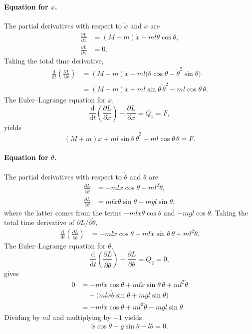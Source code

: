 \documentclass{article}
\begin{document}
\paragraph{Equation for $x$.}
The partial derivatives with respect to $\dot x$ and $x$ are
\begin{align}
\frac{\partial L}{\partial \dot x}
&= (M+m)\dot x - m l\dot\theta\cos\theta,\\
\frac{\partial L}{\partial x}
&= 0.
\end{align}
Taking the total time derivative,
\begin{align}
\frac{\mathrm{d}}{\mathrm{d}t}
\left(\frac{\partial L}{\partial \dot x}\right)
&= (M+m)\ddot x
   - m l\bigl(\ddot\theta\cos\theta - \dot\theta^2\sin\theta\bigr) \nonumber\\
&= (M+m)\ddot x
   + m l\sin\theta\,\dot\theta^2
   - m l\cos\theta\,\ddot\theta .
\end{align}
The Euler--Lagrange equation for $x$,
\[
\frac{\mathrm{d}}{\mathrm{d}t}
\left(\frac{\partial L}{\partial \dot x}\right)
- \frac{\partial L}{\partial x} = Q_1 = F,
\]
yields
\begin{equation}
\boxed{ (M+m)\ddot x
       + m l\sin\theta\,\dot\theta^2
       - m l\cos\theta\,\ddot\theta
       = F. }
\label{eq:cart_eq}
\end{equation}

\paragraph{Equation for $\theta$.}
The partial derivatives with respect to $\dot\theta$ and $\theta$ are
\begin{align}
\frac{\partial L}{\partial \dot\theta}
&= - m l\dot x\cos\theta + m l^2\dot\theta,\\
\frac{\partial L}{\partial \theta}
&= m l\dot x\dot\theta\sin\theta + m g l\sin\theta,
\end{align}
where the latter comes from the terms
$- m l\dot x\dot\theta\cos\theta$ and $- m g l\cos\theta$.
Taking the total time derivative of $\partial L/\partial\dot\theta$,
\begin{align}
\frac{\mathrm{d}}{\mathrm{d}t}
\left(\frac{\partial L}{\partial \dot\theta}\right)
&= - m l\ddot x\cos\theta
   + m l\dot x\sin\theta\,\dot\theta
   + m l^2\ddot\theta .
\end{align}
The Euler--Lagrange equation for $\theta$,
\[
\frac{\mathrm{d}}{\mathrm{d}t}
\left(\frac{\partial L}{\partial \dot\theta}\right)
- \frac{\partial L}{\partial \theta} = Q_2 = 0,
\]
gives
\begin{align}
0
&= - m l\ddot x\cos\theta
   + m l\dot x\sin\theta\,\dot\theta
   + m l^2\ddot\theta \nonumber\\
&\quad - \bigl(
   m l\dot x\dot\theta\sin\theta
   + m g l\sin\theta
   \bigr) \nonumber\\
&= - m l\ddot x\cos\theta
   + m l^2\ddot\theta
   - m g l\sin\theta.
\end{align}
Dividing by $m l$ and multiplying by $-1$ yields
\begin{equation}
\boxed{
\ddot x\cos\theta
+ g\sin\theta
- l\ddot\theta
= 0. }
\label{eq:pole_eq}
\end{equation}
\end{document}
